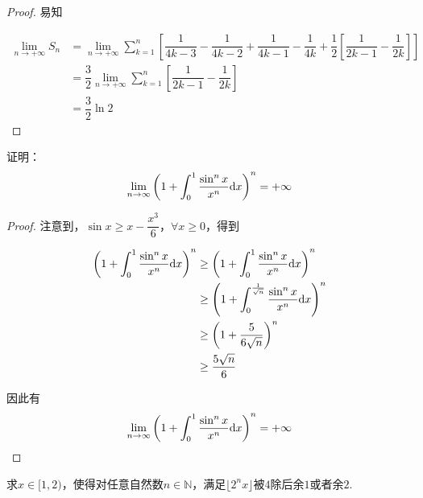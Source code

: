 \begin{proof}

    易知
    
    \begin{align*}
        \lim\limits_{n \to +\infty } S_{n} & =  \lim\limits_{n \to +\infty} \sum\limits_{k = 1}^{n} \left[ \dfrac{1}{4k - 3} - \dfrac{1}{4k - 2} + \dfrac{1}{4k - 1} - \dfrac{1}{4k}  + \dfrac{1}{2} \left[ \dfrac{1}{2k - 1} - \dfrac{1}{2k} \right] \right] \\
        & = \dfrac{3}{2} \lim\limits_{n \to + \infty} \sum\limits_{k = 1}^{n}  \left[  \dfrac{1}{2k - 1} -\dfrac{1}{2k} \right] \\
        & = \dfrac{3}{2} \ln 2
    \end{align*}

\end{proof}

\begin{proposition}

    证明：
    \[\lim\limits_{n \to \infty}{\left( 1 + \int_{0}^{1}{\dfrac{\sin^n{x}}{x^n}}\mathrm{d} x \right)^n} = + \infty\]

\end{proposition}

\begin{proof}

    注意到，$\sin{x} \geq x - \dfrac{x^3}{6}$，$\forall x \geq 0$，得到

    \begin{align*}
        \left( 1 + \int_{0}^{1}{\dfrac{\sin^n{x}}{x^n}}\mathrm{d} x \right)^n & \geq \left( 1 + \int_{0}^{1}{\dfrac{\sin^n x}{x^n}}\mathrm{d} x \right)^n \\
        & \geq \left( 1 + \int_{0}^{\frac{1}{\sqrt{n}}}{\dfrac{\sin^n{x}}{x^n}}\mathrm{d} x \right)^n \\
        & \geq \left( 1 + \dfrac{5}{6\sqrt{n}} \right)^n \\
        & \geq \dfrac{5\sqrt{n}}{6}
    \end{align*}

    因此有
    \[\lim\limits_{n \to \infty}{\left( 1 + \int_{0}^{1}{\dfrac{\sin^n{x}}{x^n}}\mathrm{d} x \right)^n} = + \infty\]

\end{proof}

\begin{proposition}

    求$x \in [1, 2)$，使得对任意自然数$n \in \mathbb{N}$，满足$\lfloor 2^n x \rfloor$被$4$除后余$1$或者余$2$.

\end{proposition}

